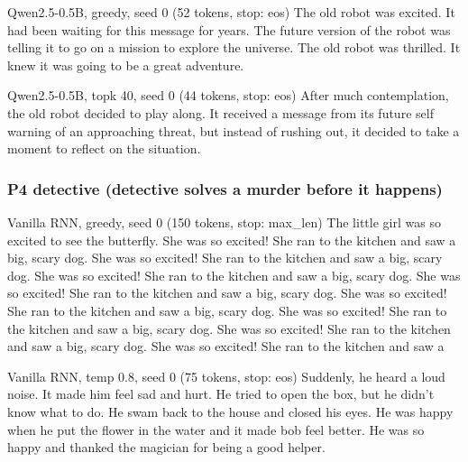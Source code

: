 \begin{modelout}{Qwen2.5-0.5B, greedy, seed 0 (52 tokens, stop: eos)}
\small The old robot was excited. It had been waiting for this message for years. The future version of the robot was telling it to go on a mission to explore the universe. The old robot was thrilled. It knew it was going to be a great adventure.
\end{modelout}


\begin{modelout}{Qwen2.5-0.5B, topk 40, seed 0 (44 tokens, stop: eos)}
\small After much contemplation, the old robot decided to play along. It received a message from its future self warning of an approaching threat, but instead of rushing out, it decided to take a moment to reflect on the situation.
\end{modelout}

\subsubsection*{P4 detective (detective solves a murder before it happens)}

\begin{modelout}{Vanilla RNN, greedy, seed 0 (150 tokens, stop: max\_len)}
\small The little girl was so excited to see the butterfly. She was so excited! She ran to the kitchen and saw a big, scary dog. She was so excited! She ran to the kitchen and saw a big, scary dog. She was so excited! She ran to the kitchen and saw a big, scary dog. She was so excited! She ran to the kitchen and saw a big, scary dog. She was so excited! She ran to the kitchen and saw a big, scary dog. She was so excited! She ran to the kitchen and saw a big, scary dog. She was so excited! She ran to the kitchen and saw a big, scary dog. She was so excited! She ran to the kitchen and saw a
\end{modelout}

\begin{modelout}{Vanilla RNN, temp 0.8, seed 0 (75 tokens, stop: eos)}
\small Suddenly, he heard a loud noise. It made him feel sad and hurt. He tried to open the box, but he didn't know what to do. He swam back to the house and closed his eyes. He was happy when he put the flower in the water and it made bob feel better. He was so happy and thanked the magician for being a good helper.
\end{modelout}

